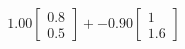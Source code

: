 \documentclass[preview]{standalone}
\begin{document}
\begin{align*}
1.00 \begin{bmatrix} 0.8 \\ 0.5 \end{bmatrix} + -0.90 \begin{bmatrix} 1 \\ 1.6 \end{bmatrix}
\end{align*}
\end{document}
